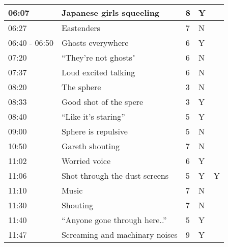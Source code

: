 \begin{longtable}{| p{70pt} | p{130pt} | p{45pt} | p{57pt} | p{60pt}|}
06:07           &           Japanese girls squeeling           &           8           &           Y          &           \\\hline
06:27           &           Eastenders           &           7           &           N          &           \\\hline
06:40 - 06:50           &           Ghosts everywhere           &           6           &           Y          &           \\\hline
07:20           &           ``They're not ghosts"           &           6           &           N          &           \\\hline
07:37           &           Loud excited talking           &           6           &           N          &           \\\hline
08:20           &           The sphere           &           3           &           N          &           \\\hline
08:33           &           Good shot of the spere           &           3           &           Y          &           \\\hline
08:40           &           ``Like it's staring''           &           5           &           Y          &           \\\hline
09:00           &           Sphere is repulsive           &           5           &           N          &           \\\hline
10:50           &           Gareth shouting           &           7           &           N          &           \\\hline
11:02           &           Worried voice           &           6           &           Y          &           \\\hline
11:06           &           Shot through the dust screens           &           5           &           Y          &   Y        \\\hline
11:10           &           Music           &           7           &           N          &           \\\hline
11:30           &           Shouting           &           7           &           N          &           \\\hline
11:40           &           ``Anyone gone through here..''           &           5           &           Y          &           \\\hline
11:47           &           Screaming and machinary noises           &           9           &           Y          &           \\\hline

\end{longtable}
